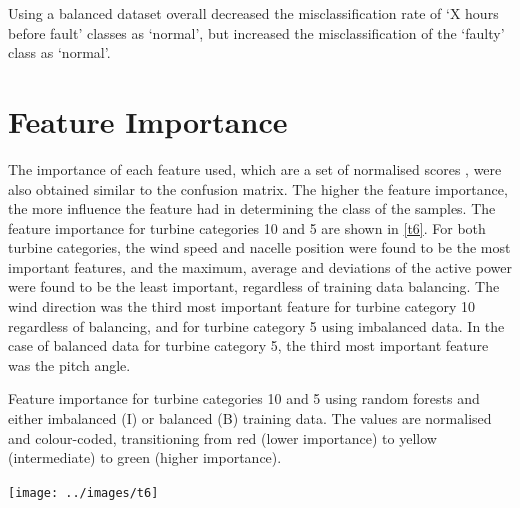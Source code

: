 Using a balanced dataset overall decreased the misclassification rate of `X
hours before fault' classes as `normal', but increased the misclassification
of the `faulty' class as `normal'.

\section{Feature Importance}

The importance of each feature used, which are a set of normalised scores
\cite{Rudy13}, were also obtained similar to the confusion matrix. The higher
the feature importance, the more influence the feature had in determining the
class of the samples. The feature importance for turbine categories 10 and 5
are shown in \autoref{t6}. For both turbine categories, the wind speed and
nacelle position were found to be the most important features, and the
maximum, average and deviations of the active power were found to be the least
important, regardless of training data balancing. The wind direction was the
third most important feature for turbine category 10 regardless of balancing,
and for turbine category 5 using imbalanced data. In the case of balanced data
for turbine category 5, the third most important feature was the pitch angle.

\begin{table}
  \centering
  \caption{\label{t6}Feature importance for turbine categories 10 and 5 using
  random forests and either imbalanced (I) or balanced (B) training data. The
  values are normalised and colour-coded, transitioning from red (lower
  importance) to yellow (intermediate) to green (higher importance).}
  \texttt{[image: ../images/t6]}
\end{table}
